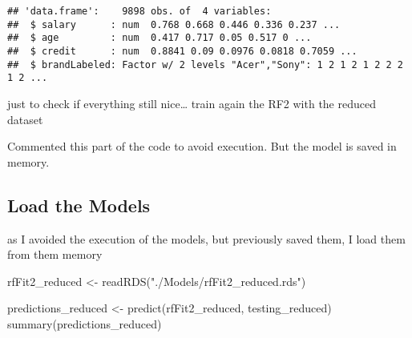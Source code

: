 \documentclass[
]{article}
\newenvironment{Shaded}{\begin{snugshade}}{\end{snugshade}}
\newcommand{\AttributeTok}[1]{\textcolor[rgb]{0.77,0.63,0.00}{#1}}
\newcommand{\CommentTok}[1]{\textcolor[rgb]{0.56,0.35,0.01}{\textit{#1}}}
\newcommand{\ConstantTok}[1]{\textcolor[rgb]{0.00,0.00,0.00}{#1}}
\newcommand{\DecValTok}[1]{\textcolor[rgb]{0.00,0.00,0.81}{#1}}
\newcommand{\FunctionTok}[1]{\textcolor[rgb]{0.00,0.00,0.00}{#1}}
\newcommand{\NormalTok}[1]{#1}
\newcommand{\OtherTok}[1]{\textcolor[rgb]{0.56,0.35,0.01}{#1}}
\newcommand{\SpecialCharTok}[1]{\textcolor[rgb]{0.00,0.00,0.00}{#1}}
\newcommand{\StringTok}[1]{\textcolor[rgb]{0.31,0.60,0.02}{#1}}
\begin{document}
\begin{verbatim}
## 'data.frame':    9898 obs. of  4 variables:
##  $ salary      : num  0.768 0.668 0.446 0.336 0.237 ...
##  $ age         : num  0.417 0.717 0.05 0.517 0 ...
##  $ credit      : num  0.8841 0.09 0.0976 0.0818 0.7059 ...
##  $ brandLabeled: Factor w/ 2 levels "Acer","Sony": 1 2 1 2 1 2 2 2 1 2 ...
\end{verbatim}

just to check if everything still nice\ldots{} train again the RF2 with
the reduced dataset

\begin{Shaded}
\end{Shaded}

Commented this part of the code to avoid execution. But the model is
saved in memory.

\hypertarget{load-the-models-1}{%
\subsection{Load the Models}\label{load-the-models-1}}

as I avoided the execution of the models, but previously saved them, I
load them from them memory

\begin{Shaded}
\begin{Highlighting}[]
\NormalTok{rfFit2\_reduced }\OtherTok{\textless{}{-}} \FunctionTok{readRDS}\NormalTok{(}\StringTok{"./Models/rfFit2\_reduced.rds"}\NormalTok{)}
\end{Highlighting}
\end{Shaded}

\begin{Shaded}
\begin{Highlighting}[]
\NormalTok{predictions\_reduced }\OtherTok{\textless{}{-}} \FunctionTok{predict}\NormalTok{(rfFit2\_reduced, testing\_reduced)}
\FunctionTok{summary}\NormalTok{(predictions\_reduced)}
\end{Highlighting}
\end{Shaded}
\end{document}
